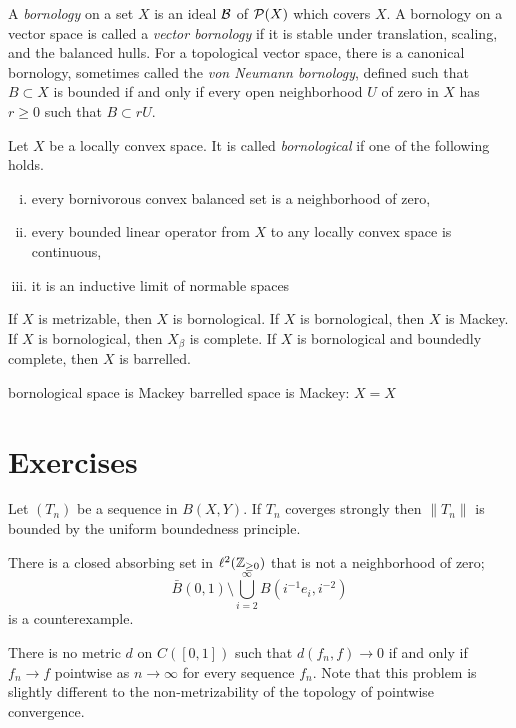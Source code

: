 \documentclass{../../large}
\begin{document}
\begin{prb}
A \emph{bornology} on a set $X$ is an ideal $\mathcal{B}$ of $\mathcal{P}(X)$ which covers $X$.
A bornology on a vector space is called a \emph{vector bornology} if it is stable under translation, scaling, and the balanced hulls.
For a topological vector space, there is a canonical bornology, sometimes called the \emph{von Neumann bornology}, defined such that $B\subset X$ is bounded if and only if every open neighborhood $U$ of zero in $X$ has $r\ge0$ such that $B\subset rU$.

Let $X$ be a locally convex space.
It is called \emph{bornological} if one of the following holds.
\begin{enumerate}[(i)]
\item every bornivorous convex balanced set is a neighborhood of zero,
\item every bounded linear operator from $X$ to any locally convex space is continuous,
\item it is an inductive limit of normable spaces
\end{enumerate}

If $X$ is metrizable, then $X$ is bornological.
If $X$ is bornological, then $X$ is Mackey.
If $X$ is bornological, then $X_\beta$ is complete.
If $X$ is bornological and boundedly complete, then $X$ is barrelled.

\end{prb}


bornological space is Mackey
barrelled space is Mackey: $X=X$



\section*{Exercises}

\begin{prb}
Let $(T_n)$ be a sequence in $B(X,Y)$.
If $T_n$ coverges strongly then $\|T_n\|$ is bounded by the uniform boundedness principle.
\end{prb}

\begin{prb}
There is a closed absorbing set in $\ell^2(\mathbb{Z}_{\ge0})$ that is not a neighborhood of zero;
\[\bar B(0,1)\setminus\bigcup_{i=2}^\infty B(i^{-1}e_i,i^{-2})\]
is a counterexample.
\end{prb}




\begin{prb}
There is no metric $d$ on $C([0,1])$ such that $d(f_n,f)\to0$ if and only if $f_n\to f$ pointwise as $n\to\infty$ for every sequence $f_n$.
Note that this problem is slightly different to the non-metrizability of the topology of pointwise convergence.
\end{prb}
\end{document}
